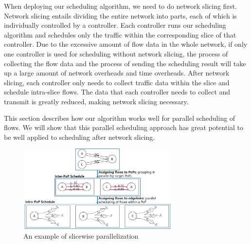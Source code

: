 
When deploying our scheduling algorithm, we need to do network slicing first. Network slicing entails dividing the entire network into parts, each of which is individually controlled by a controller. Each controller runs our scheduling algorithm and schedules only the traffic within the corresponding slice of that controller. Due to the excessive amount of flow data in the whole network, if only one controller is used for scheduling without network slicing, the process of collecting the flow data and the process of sending the scheduling result will take up a large amount of network overheads and time overheads. After network slicing, each controller only needs to collect traffic data within the slice and schedule intra-slice flows. The data that each controller needs to collect and transmit is greatly reduced, making network slicing necessary.

This section describes how our algorithm works well for parallel scheduling of flows. We will show that this parallel scheduling approach has great potential to be well applied to scheduling after network slicing. 


\begin{figure}
	\centering
	\includegraphics[width = 8cm]{figs/implement/network slicing.jpg}
	\caption{\small An example of slicewise parallelization}
	\label{fig:network slicing}
\end{figure}


